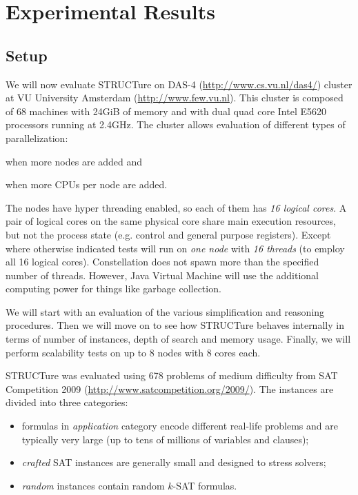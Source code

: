 \chapter{Experimental Results}
\label{chap:results}

\newcommand{\plot}[1]{
  \subfigure{
    \texttt{[image: data/all/\#1]}
  }

  \subfigure{
    \texttt{[image: data/random/\#1]}
  }

  \subfigure{
    \texttt{[image: data/nonrandom/\#1]}
  }
}

\section{Setup}

We will now evaluate STRUCTure on DAS-4 (\url{http://www.cs.vu.nl/das4/})
cluster at VU University Amsterdam (\url{http://www.few.vu.nl}).
This cluster is composed of 68 machines with 24GiB of memory and with
dual quad core Intel E5620 processors running at 2.4GHz. The
cluster allows evaluation of different types of parallelization:
\begin{inparaenum}[1)]
  \item when more nodes are added and
  \item when more CPUs per node are added.
\end{inparaenum}

The nodes have hyper threading enabled, so each of them has \emph{16
logical cores}. A pair of logical cores on the same physical core
share main execution resources, but not the process state
(e.g. control and general purpose registers).  Except where otherwise
indicated tests will run on \emph{one node} with \emph{16 threads}
(to employ all 16 logical cores). Constellation does not spawn more
than the specified number of threads. However, Java Virtual Machine will
use the additional computing power for things like garbage collection.

We will start with an evaluation of the various simplification and
reasoning procedures. Then we will move on to see how STRUCTure
behaves internally in terms of number of instances, depth of search
and memory usage. Finally, we will perform scalability tests on up
to 8 nodes with 8 cores each.

STRUCTure was evaluated using 678 problems of medium difficulty from
SAT Competition 2009 (\url{http://www.satcompetition.org/2009/}). The
instances are divided into three categories:
\begin{itemize}
  \item formulas in \emph{application} category encode different
  real-life problems and are typically very large (up to tens of
  millions of variables and clauses);
  \item \emph{crafted} SAT instances are generally small and designed
  to stress solvers;
  \item \emph{random} instances contain random $k$-SAT formulas.
\end{itemize}

